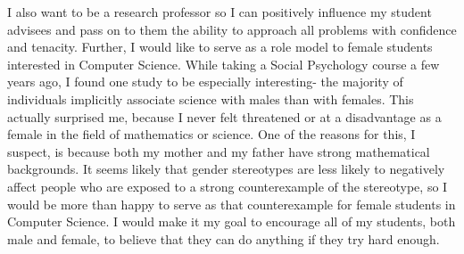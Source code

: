 \documentclass[12pt]{article}
\begin{document}
I also want to be a research professor so I can positively influence my student advisees and pass on to them the ability to approach all problems with confidence and tenacity. 
Further, I would like to serve as a role model to female students interested in Computer Science. 
While taking a Social Psychology course a few years ago, I found one study to be especially interesting- the majority of individuals implicitly associate science with males than with females. 
This actually surprised me, because I never felt threatened or at a disadvantage as a female in the field of mathematics or science. 
One of the reasons for this, I suspect, is because both my mother and my father have strong mathematical backgrounds. 
It seems likely that gender stereotypes are less likely to negatively affect people who are exposed to a strong counterexample of the stereotype, 
so I would be more than happy to serve as that counterexample for female students in Computer Science. 
I would make it my goal to encourage all of my students, both male and female, to believe that they can do anything if they try hard enough.

\begingroup
    \setlength{\bibsep}{-1pt}
    
    
\endgroup
\end{document}
